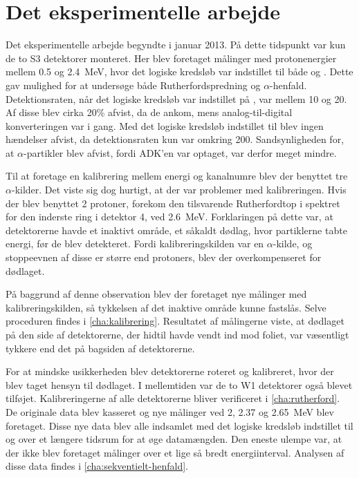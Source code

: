 \chapter{Det eksperimentelle arbejde}
\label{cha:eksp}

Det eksperimentelle arbejde begyndte i januar 2013. På dette tidspunkt var kun de to S3 detektorer
monteret. Her blev foretaget målinger med protonenergier mellem \num{0.5} og \SI{2.4}{\MeV}, hvor
det logiske kredsløb var indstillet til både \lAND og \lOR. Dette gav mulighed for at undersøge både
Rutherfordspredning og $\alpha$-henfald. Detektionsraten, når det logiske kredsløb var indstillet på \lOR,
var mellem 10 og 20\kHz. Af disse blev cirka 20\% afvist, da de ankom, mens analog-til-digital
konverteringen var i gang. Med det logiske kredsløb indstillet til \lAND blev ingen hændelser afvist,
da detektionsraten kun var omkring 200\Hz. Sandsynligheden for, at $\alpha$-partikler blev afvist, fordi
ADK'en var optaget, var derfor meget mindre.

Til at foretage en kalibrering mellem energi og kanalnumre blev der benyttet tre $\alpha$-kilder. Det
viste sig dog hurtigt, at der var problemer med kalibreringen. Hvis der blev benyttet 2\MeV
protoner, forekom den tilsvarende Rutherfordtop i spektret for den inderste ring i detektor 4, ved
\SI{2.6}{\MeV}. Forklaringen på dette var, at detektorerne havde et inaktivt område, et såkaldt
dødlag, hvor partiklerne tabte energi, før de blev detekteret. Fordi kalibreringskilden var en
$\alpha$-kilde, og stoppeevnen af disse er større end protoners, blev der overkompenseret for dødlaget.

På baggrund af denne observation blev der foretaget nye målinger med kalibreringskilden, så
tykkelsen af det inaktive område kunne fastslås. Selve proceduren findes i
\cref{cha:kalibrering}. Resultatet af målingerne viste, at dødlaget på den side af detektorerne, der
hidtil havde vendt ind mod foliet, var væsentligt tykkere end det på bagsiden af detektorerne. 

For at mindske usikkerheden blev detektorerne roteret og kalibreret, hvor der blev taget hensyn til
dødlaget.  I mellemtiden var de to W1 detektorer også blevet tilføjet. Kalibreringerne af alle
detektorerne bliver verificeret i \cref{cha:rutherford}. De originale data blev kasseret og nye
målinger ved 2, \num{2.37} og \SI{2.65}{\MeV} blev foretaget. Disse nye data blev alle
indsamlet med det logiske kredsløb indstillet til \lAND og over et længere tidsrum for at øge
datamængden. Den eneste ulempe var, at der ikke blev foretaget målinger over et lige så bredt
energiinterval. Analysen af disse data findes i \cref{cha:sekventielt-henfald}.


